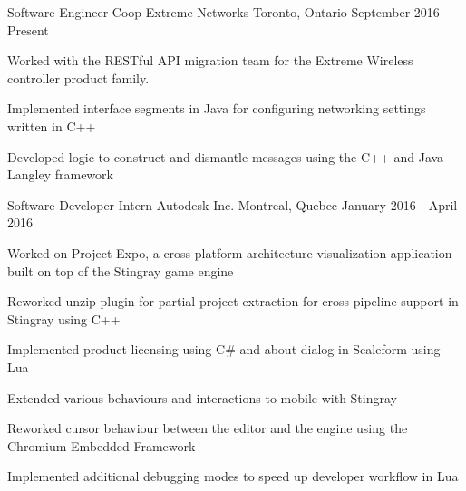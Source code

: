 


\begin{cventries}


\cventry
{Software Engineer Coop}
{Extreme Networks}
{Toronto, Ontario}
{September 2016 - Present}
{ %
Worked with the RESTful API migration team for the Extreme Wireless controller product family.
\begin{cvitems}
\item[]
\item {Implemented interface segments in Java for configuring networking settings written in C++}
\item {Developed logic to construct and dismantle messages using the C++ and Java Langley framework}
\end{cvitems}
}


\cventry
{Software Developer Intern}
{Autodesk Inc.}
{Montreal, Quebec}
{January 2016 - April 2016}
{ %
Worked on Project Expo, a cross-platform architecture visualization application built on top of the Stingray game engine
\begin{cvitems}
\item[]
\item {Reworked unzip plugin for partial project extraction for cross-pipeline support in Stingray using C++}
\item {Implemented product licensing using C\# and about-dialog in Scaleform using Lua}
\item {Extended various behaviours and interactions to mobile with Stingray}
\item {Reworked cursor behaviour between the editor and the engine using the Chromium Embedded Framework}
\item {Implemented additional debugging modes to speed up developer workflow in Lua}
\end{cvitems}
}


\end{cventries}
